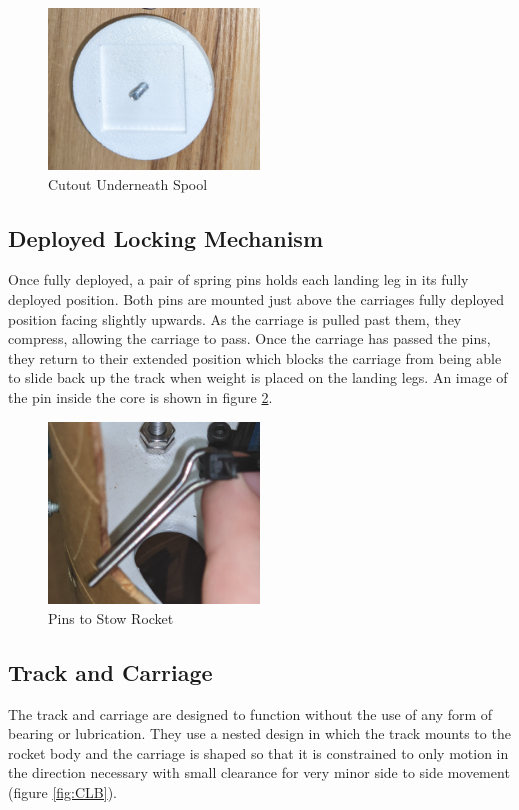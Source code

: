 \begin{figure}[H]
    \centering
    \includegraphics[width=0.5\textwidth]{src/figs/Spool_Cutout.jpg}
    \caption{Cutout Underneath Spool}
    \label{fig:spoolc}
\end{figure}

\subsection{Deployed Locking Mechanism}
Once fully deployed, a pair of spring pins holds each landing leg in its fully deployed position. Both pins are mounted just above the carriages fully deployed position facing slightly upwards. As the carriage is pulled past them, they compress, allowing the carriage to pass. Once the carriage has passed the pins, they return to their extended position which blocks the carriage from being able to slide back up the track when weight is placed on the landing legs. An image of the pin inside the core is shown in figure \ref{fig:pin_rocket}.

\begin{figure}[H]
    \centering
    \includegraphics[width=0.5\textwidth]{src/figs/Pins_Rocket.jpg}
    \caption{Pins to Stow Rocket}
    \label{fig:pin_rocket}
\end{figure}

\subsection{Track and Carriage}
The track and carriage are designed to function without the use of any form of bearing or lubrication. They use a nested design in which the track mounts to the rocket body and the carriage is shaped so that it is constrained to only motion in the direction necessary with small clearance for very minor side to side movement (figure \ref{fig:CLB}). 

